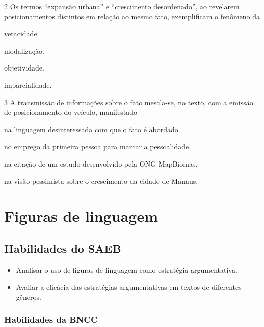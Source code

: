 \num{2} Os termos ``expansão urbana'' e ``crescimento desordenado'', ao
revelarem posicionamentos distintos em relação ao mesmo fato,
exemplificam o fenômeno da

\begin{escolha}
\item veracidade.

\item modalização.

\item objetividade.

\item imparcialidade.
\end{escolha}

\num{3} A transmissão de informações sobre o fato mescla-se, no texto,
com a emissão de posicionamento do veículo, manifestado

\begin{escolha}
\item na linguagem desinteressada com que o fato é abordado.

\item no emprego da primeira pessoa para marcar a pessoalidade.

\item na citação de um estudo desenvolvido pela ONG MapBiomas.

\item na visão pessimista sobre o crescimento da cidade de Manaus.
\end{escolha}

\chapter{Figuras de linguagem}

\section{Habilidades do SAEB}

\begin{itemize}
\tightlist
\item
  Analisar o uso de figuras de linguagem como estratégia argumentativa.
\item
  Avaliar a eficácia das estratégias argumentativas em textos de
  diferentes gêneros.
\end{itemize}

\subsection{Habilidades da BNCC}

